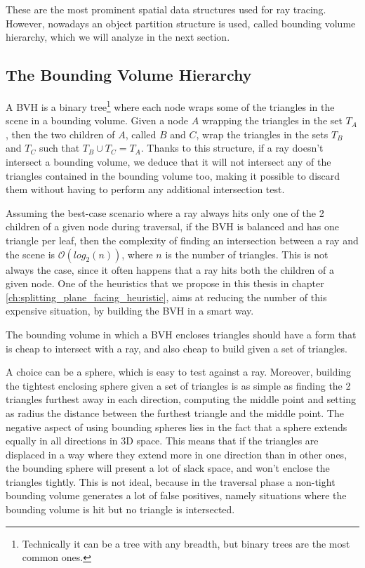\documentclass{PoliMi_MasterThesis}
\begin{document}
These are the most prominent spatial data structures used for ray tracing. However, nowadays an object partition structure is used, called bounding volume hierarchy, which we will analyze in the next section.

\subsection{The Bounding Volume Hierarchy} \label{ssec:the_bounding_volume_hierarchy}
A BVH \cite{bvh_primer} is a binary tree\footnote{Technically it can be a tree with any breadth, but binary trees are the most common ones.} where each node wraps some of the triangles in the scene in a bounding volume. Given a node $A$ wrapping the triangles in the set $T_A$, then the two children of $A$, called $B$ and $C$, wrap the triangles in the sets $T_B$ and $T_C$ such that $T_B \cup T_C = T_A$. Thanks to this structure, if a ray doesn't intersect a bounding volume, we deduce that it will not intersect any of the triangles contained in the bounding volume too, making it possible to discard them without having to perform any additional intersection test.

Assuming the best-case scenario where a ray always hits only one of the 2 children of a given node during traversal, if the BVH is balanced and has one triangle per leaf, then the complexity of finding an intersection between a ray and the scene is $\mathcal{O}(log_2(n))$, where $n$ is the number of triangles. This is not always the case, since it often happens that a ray hits both the children of a given node. One of the heuristics that we propose in this thesis in chapter \ref{ch:splitting_plane_facing_heuristic}, aims at reducing the number of this expensive situation, by building the BVH in a smart way.

The bounding volume in which a BVH encloses triangles should have a form that is cheap to intersect with a ray, and also cheap to build given a set of triangles.

A choice can be a sphere, which is easy to test against a ray. Moreover, building the tightest enclosing sphere given a set of triangles is as simple as finding the 2 triangles furthest away in each direction, computing the middle point and setting as radius the distance between the furthest triangle and the middle point. The negative aspect of using bounding spheres lies in the fact that a sphere extends equally in all directions in 3D space. This means that if the triangles are displaced in a way where they extend more in one direction than in other ones, the bounding sphere will present a lot of slack space, and won't enclose the triangles tightly. This is not ideal, because in the traversal phase a non-tight bounding volume generates a lot of false positives, namely situations where the bounding volume is hit but no triangle is intersected.
\end{document}
